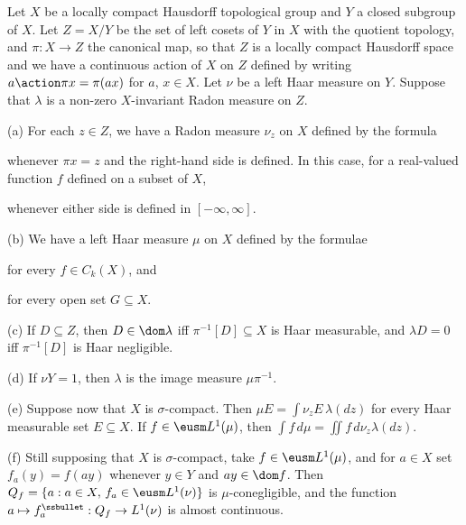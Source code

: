 {} Let $X$ be a locally compact Hausdorff
topological group and $Y$ a closed subgroup of $X$.   Let $Z=X/Y$ be the
set of left cosets of $Y$ in $X$ with the quotient topology, and
$\pi:X\to Z$ the canonical map, so that $Z$ is
a locally compact Hausdorff space and we have a continuous action of $X$
on $Z$ defined by writing $a\action\pi x=\pi(ax)$ for $a$,
$x\in X$.   Let $\nu$ be a left Haar measure on $Y$.   Suppose that
$\lambda$ is a non-zero $X$-invariant Radon measure on $Z$.

(a) For each $z\in Z$, we have a Radon measure $\nu_z$ on $X$ defined
by the formula


\noindent whenever $\pi x=z$ and the right-hand side is defined.   In
this case, for a real-valued function $f$ defined on a subset of $X$,


\noindent whenever either side is defined in $[-\infty,\infty]$.

(b) We have a left Haar measure $\mu$ on $X$ defined by the formulae


\noindent for every $f\in C_k(X)$, and


\noindent for every open set $G\subseteq X$.

(c) If $D\subseteq Z$, then $D\in\dom\lambda$ iff
$\pi^{-1}[D]\subseteq X$ is
Haar measurable, and $\lambda D=0$ iff $\pi^{-1}[D]$ is Haar negligible.

(d) If $\nu Y=1$, then $\lambda$ is the image measure $\mu\pi^{-1}$.

(e) Suppose now that $X$ is $\sigma$-compact.   Then
$\mu E=\int\nu_zE\,\lambda(dz)$ for every Haar measurable set
$E\subseteq X$.   If $f\in\eusm L^1(\mu)$, then
$\int f\,d\mu=\iint f\,d\nu_z\lambda(dz)$.

(f) Still supposing that $X$ is $\sigma$-compact, take
$f\in\eusm L^1(\mu)$, and for $a\in X$ set $f_a(y)=f(ay)$ whenever
$y\in Y$ and
$ay\in\dom f$.  Then $Q_f=\{a:a\in X,\,f_a\in\eusm L^1(\nu)\}$ is
$\mu$-conegligible, and the function
$a\mapsto f_a^{\ssbullet}:Q_f\to L^1(\nu)$ is almost continuous.

